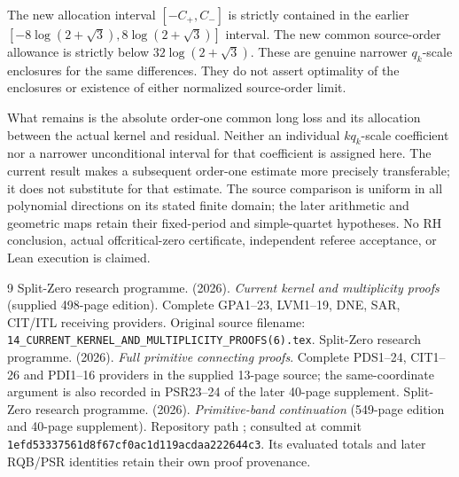 \documentclass[11pt,a4paper]{article}
\begin{document}
The new allocation interval $[-C_+,C_-]$ is strictly contained in the earlier
$[-8\log(2+\sqrt3),8\log(2+\sqrt3)]$ interval.
The new common source-order allowance is strictly below
$32\log(2+\sqrt3)$. These are genuine narrower $q_k$-scale enclosures for the
same differences. They do not assert optimality of the enclosures or existence
of either normalized source-order limit.

What remains is the absolute order-one common long loss and its allocation
between the actual kernel and residual. Neither an individual $kq_k$-scale
coefficient nor a narrower unconditional interval for that coefficient is
assigned here. The current result makes a subsequent order-one estimate more
precisely transferable; it does not substitute for that estimate.
The source comparison is uniform in all polynomial directions on its stated
finite domain; the later arithmetic and geometric maps retain their fixed-period
and simple-quartet hypotheses. No RH conclusion, actual offcritical-zero
certificate, independent referee acceptance, or Lean execution is claimed.


\endgroup

\begin{thebibliography}{9}
Split-Zero research programme. (2026). \emph{Current kernel and multiplicity proofs} (supplied 498-page edition). Complete GPA1--23, LVM1--19, DNE, SAR, CIT/ITL receiving providers. Original source filename: \texttt{14\_CURRENT\_KERNEL\_AND\_MULTIPLICITY\_PROOFS(6).tex}.
Split-Zero research programme. (2026). \emph{Full primitive connecting proofs}. Complete PDS1--24, CIT1--26 and PDI1--16 providers in the supplied 13-page source; the same-coordinate argument is also recorded in PSR23--24 of the later 40-page supplement.
Split-Zero research programme. (2026). \emph{Primitive-band continuation} (549-page edition and 40-page supplement). Repository path ; consulted at commit \texttt{1efd53337561d8f67cf0ac1d119acdaa222644c3}. Its evaluated totals and later RQB/PSR identities retain their own proof provenance.
\end{thebibliography}
\end{document}
